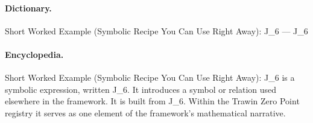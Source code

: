 \paragraph{Dictionary.}
Short Worked Example (Symbolic Recipe You Can Use Right Away): J\_6 — J\_6

\paragraph{Encyclopedia.}
Short Worked Example (Symbolic Recipe You Can Use Right Away): J\_6 is a symbolic expression, written J\_6. It introduces a symbol or relation used elsewhere in the framework. It is built from J\_6. Within the Trawin Zero Point registry it serves as one element of the framework's mathematical narrative.
